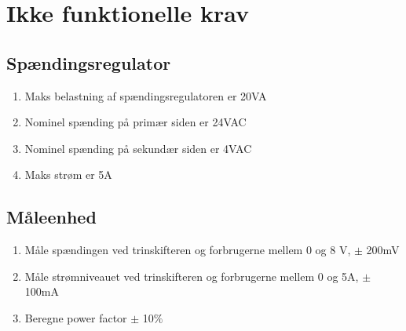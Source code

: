 
\section{Ikke funktionelle krav}

\subsection{Spændingsregulator}
\begin{enumerate}
	\item Maks belastning af spændingsregulatoren er 20VA
	\item Nominel spænding på primær siden er 24VAC
	\item Nominel spænding på sekundær siden er 4VAC
	\item Maks strøm er 5A	
\end{enumerate}

\subsection{Måleenhed}

\begin{enumerate}
	\item Måle spændingen ved trinskifteren og forbrugerne mellem 0 og 8 V, $\pm$ 200mV 
	\item Måle strømniveauet ved trinskifteren og forbrugerne mellem 0 og 5A, $\pm$ 100mA
	\item Beregne power factor $\pm$ 10$\%$
\end{enumerate}



